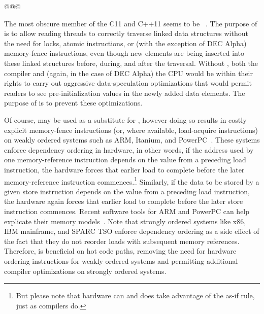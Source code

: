 \documentclass[letterpaper,twocolumn,10pt]{article}
\begin{document}
@@@

The most obscure member of the C11 and C++11  
seems to be
~\cite{RichardSmith2015N4527}.
The purpose of  is to allow reading threads
to correctly traverse linked data structures without the need for locks,
atomic instructions, or (with the exception of DEC Alpha) memory-fence
instructions, even though new elements are being inserted into these
linked structures before, during, and after the traversal.
Without , both the compiler and (again, in the case
of DEC Alpha) the CPU would be within their rights to carry out aggressive
data-speculation optimizations that would permit readers to see
pre-initialization values in the newly added data elements.
The purpose of  is to prevent these optimizations.

Of course,  may be used as a substitute for
, however doing so results in costly
explicit memory-fence instructions (or, where available, load-acquire
instructions) on weakly ordered systems such as ARM, Itanium, and
PowerPC~\cite{ARMv7A:2010,ARMv8Litmus2009,IntelItaniumMemoryOrdering2002,PowerISA2.07-2013}.
These systems enforce dependency ordering in hardware, in other words,
if the address used by one memory-reference instruction depends on the
value from a preceding load instruction, the hardware forces that
earlier load to complete before the later memory-reference instruction
commences.\footnote{
	But please note that hardware can and does take advantage
	of the as-if rule, just as compilers do.}
Similarly, if the data to be stored by a given store instruction depends
on the value from a preceding load instruction, the hardware again
forces that earlier load to complete before the later store instruction
commences.
Recent software tools for ARM and PowerPC can help explicate their
memory models~\cite{JadeAlglave2011ppcmem,Alglave:2014:HCM:2594291.2594347,PaulEMcKenney2011ppcmem,PaulEMcKenney2014weakaxiom}.
Note that strongly ordered systems like x86, IBM mainframe, and
SPARC TSO enforce dependency ordering as a side effect of the
fact that they do not reorder loads with subsequent memory references.
Therefore,  is beneficial on hot code paths,
removing the need for hardware ordering instructions for weakly ordered
systems and permitting additional compiler optimizations on
strongly ordered systems.
\end{document}
